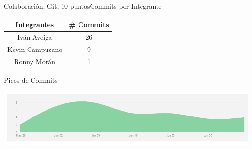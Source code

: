 \documentclass[9pt]{beamer}
\begin{document}
	\begin{frame}{Colaboración: Git, 10 puntos}{Commits por 	Integrante}
		\begin{tabular}{|c|c|}
		\hline Integrantes & # Commits \\ 
		\hline Iván Aveiga & 26 \\ 
		\hline Kevin Campuzano & 9 \\ 
		\hline Ronny Morán & 1 \\ 
		\hline 
		\end{tabular} 
	\end{frame}	
	\begin{frame}{Picos de Commits}
		\begin{center}
			\includegraphics[width = 1.0\textwidth]{picos.png}
		\end{center}
	\end{frame}	
\end{document}
